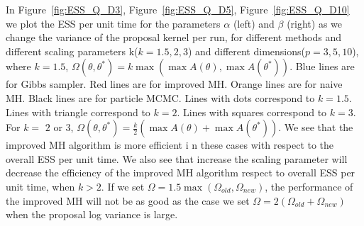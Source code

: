   In Figure~\ref{fig:ESS_Q_D3}, Figure~\ref{fig:ESS_Q_D5}, Figure~\ref{fig:ESS_Q_D10} we plot the ESS per unit time for the parameters $\alpha$ (left) and $\beta$ (right) as we change the variance of the
  proposal kernel per run, for different methods and different scaling parameters k($k = 1.5, 2, 3$) and different dimensions($p = 3, 5, 10$), where   $k = 1.5$,  $\Omega(\theta, \theta^*) = k \max(\max A(\theta), \max A(\theta^*))$. Blue lines are for Gibbs sampler. Red lines are for improved MH. Orange lines are for naive MH. Black lines are for particle MCMC. Lines with dots correspond to $k = 1.5$. Lines with triangle correspond to $k = 2$. Lines with squares correspond to $k = 3$. For $k=$ $2$ or $3$, $\Omega(\theta, \theta^*) = \frac{k}{2} (\max A(\theta) + \max A(\theta^*))$. We see that the improved MH algorithm is more efficient i	n these cases with respect to the overall ESS per unit time. We also see that increase the scaling parameter will decrease the efficiency of the improved MH algorithm respect to overall ESS per unit time, when $k > 2$. If we set $\Omega = 1.5 \max(\Omega_{old}, \Omega_{new})$, the performance of the improved MH will not be as good as the case we set $\Omega = 2(\Omega_{old} + \Omega_{new})$ when the proposal log variance is large.\\


